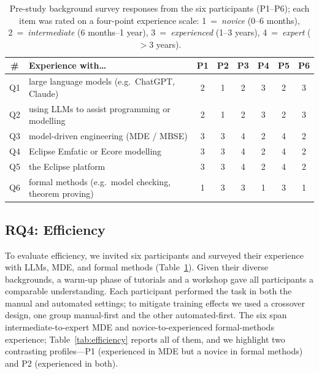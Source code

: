 \begin{table}[H]
\caption{Pre-study background survey responses from the six participants (P1--P6); each item was rated on a four-point experience scale: 1~=~\emph{novice} (0--6 months), 2~=~\emph{intermediate} (6 months--1 year), 3~=~\emph{experienced} (1--3 years), 4~=~\emph{expert} (${>}3$ years).}
\label{tab:survey}
\centering
\small
\begin{tabular}{clcccccc}
\hline
\textbf{\#} & \textbf{Experience with\ldots} & \textbf{P1} & \textbf{P2} & \textbf{P3} & \textbf{P4} & \textbf{P5} & \textbf{P6} \\ \hline
Q1 & large language models (e.g.\ ChatGPT, Claude) & 2 & 1 & 2 & 3 & 2 & 3 \\
Q2 & using LLMs to assist programming or modelling & 2 & 1 & 2 & 3 & 2 & 3 \\
Q3 & model-driven engineering (MDE / MBSE) & 3 & 3 & 4 & 2 & 4 & 2 \\
Q4 & Eclipse Emfatic or Ecore modelling & 3 & 3 & 4 & 2 & 4 & 2 \\
Q5 & the Eclipse platform & 3 & 3 & 4 & 2 & 4 & 2 \\
Q6 & formal methods (e.g.\ model checking, theorem proving) & 1 & 3 & 3 & 1 & 3 & 1 \\ \hline
\end{tabular}
\end{table}

\subsection{RQ4: Efficiency}
To evaluate efficiency, we invited six participants and surveyed their experience with LLMs, MDE, and formal methods (Table~\ref{tab:survey}). Given their diverse backgrounds, a warm-up phase of tutorials and a workshop gave all participants a comparable understanding. Each participant performed the task in both the manual and automated settings; to mitigate training effects we used a crossover design, one group manual-first and the other automated-first. The six span intermediate-to-expert MDE and novice-to-experienced formal-methods experience; Table~\ref{tab:efficiency} reports all of them, and we highlight two contrasting profiles---P1 (experienced in MDE but a novice in formal methods) and P2 (experienced in both).


